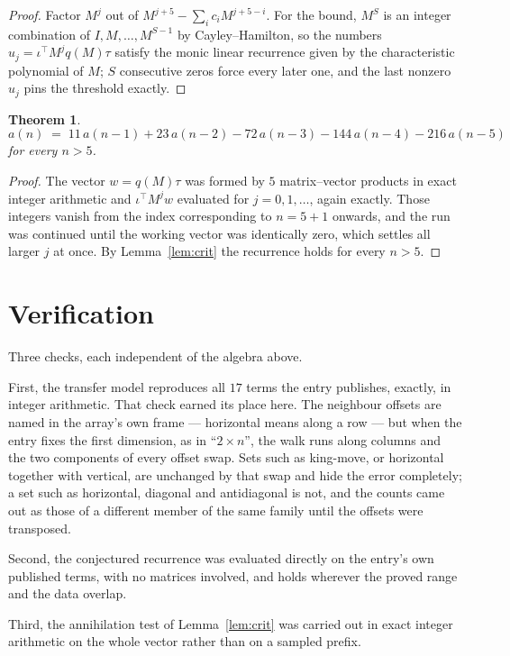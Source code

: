 \documentclass[11pt,a4paper]{article}
\theoremstyle{plain}
\newtheorem{theorem}{Theorem}
\theoremstyle{definition}
\begin{document}
\begin{proof}
Factor $M^{j}$ out of $M^{j+5}-\sum_ic_iM^{j+5-i}$. For the bound, $M^{S}$
is an integer combination of $I,M,\dots,M^{S-1}$ by Cayley--Hamilton, so the numbers
$u_j=\iota^{\!\top}M^{j}q(M)\tau$ satisfy the monic linear recurrence given by the
characteristic polynomial of $M$; $S$ consecutive zeros force every later one, and the last
nonzero $u_j$ pins the threshold exactly.
\end{proof}

\begin{theorem}
\[
a(n)\;=\;11\,a(n-1) + 23\,a(n-2) - 72\,a(n-3) - 144\,a(n-4) - 216\,a(n-5)
\]
for every $n>5$.
\end{theorem}

\begin{proof}
The vector $w=q(M)\tau$ was formed by $5$ matrix--vector products in exact integer
arithmetic and $\iota^{\!\top}M^{j}w$ evaluated for $j=0,1,\dots$, again exactly. Those
integers vanish from the index corresponding to $n=5+1$ onwards, and the run was
continued until the working vector was identically zero, which settles all larger $j$ at once.
By Lemma~\ref{lem:crit} the recurrence holds for every $n>5$.
\end{proof}

\section{Verification}

Three checks, each independent of the algebra above.

First, the transfer model reproduces all $17$ terms the entry publishes, exactly, in
integer arithmetic. That check earned its place here. The neighbour offsets are named in the
array's own frame --- horizontal means along a row --- but when the entry fixes the first
dimension, as in ``$2\times n$'', the walk runs along columns and the two components of every
offset swap. Sets such as king-move, or horizontal together with vertical, are unchanged by
that swap and hide the error completely; a set such as horizontal, diagonal and antidiagonal
is not, and the counts came out as those of a different member of the same family until the
offsets were transposed.

Second, the conjectured recurrence was evaluated directly on the entry's own published terms,
with no matrices involved, and holds wherever the proved range and the data overlap.

Third, the annihilation test of Lemma~\ref{lem:crit} was carried out in exact integer
arithmetic on the whole vector rather than on a sampled prefix.
\end{document}
